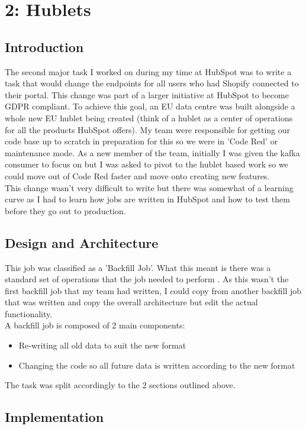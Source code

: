 \chapter{2: Hublets}

\section{Introduction}
The second major task I worked on during my time at HubSpot was to write a task that would change the endpoints for all users who had Shopify connected to their portal. This change was part of a larger initiative at HubSpot to become GDPR compliant. To achieve this goal, an EU data centre was built alongside a whole new EU hublet being created (think of a hublet as a center of operations for all the products HubSpot offers). My team were responsible for getting our code base up to scratch in preparation for this so we were in 'Code Red' or maintenance mode. As a new member of the team, initially I was given the kafka consumer to focus on but I was asked to pivot to the hublet based work so we could move out of Code Red faster and move onto creating new features. \newline \\ This change wasn't very difficult to write but there was somewhat of a learning curve as I had to learn how jobs are written in HubSpot and how to test them before they go out to production. 

\section{Design and Architecture}
This job was classified as a 'Backfill Job'. What this meant is there was a standard set of operations that the job needed to perform . As this wasn't the first backfill job that my team had written, I could copy from another backfill job that was written and copy the overall architecture but edit the actual functionality. \newline \\ A backfill job is composed of 2 main components: \begin{itemize}
\item Re-writing all old data to suit the new format
\item Changing the code so all future data is written according to the new format
\end{itemize}

The task was split accordingly to the 2 sections outlined above.
\section{Implementation}

